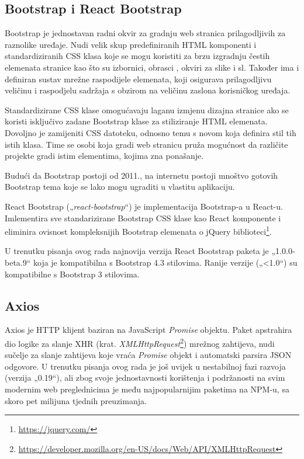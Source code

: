 \documentclass[times, utf8, diplomski, numeric]{fer}
\newcommand{\razmakp}{\vspace{18pt}}
\newcommand{\razmaks}{\vspace{10pt}}
\begin{document}
\razmaks
\subsection{Bootstrap i React Bootstrap}

Bootstrap je jednostavan radni okvir za gradnju web stranica prilagodljivih za raznolike uređaje.
Nudi velik skup predefiniranih HTML komponenti i standardiziranih CSS klasa koje se mogu koristiti za brzu izgradnju čestih elemenata stranice kao što su izbornici, obrasci , okviri za slike i sl.
Također ima i definiran sustav mrežne raspodijele elemenata, koji osigurava prilagodljivu veličinu i raspodjelu sadržaja s obzirom na veličinu zaslona korisničkog uređaja.

Standardizirane CSS klase omogućavaju laganu izmjenu dizajna stranice ako se koristi isključivo zadane Bootstrap klase za stiliziranje HTML elemenata.
Dovoljno je zamijeniti CSS datoteku, odnosno temu s novom koja definira stil tih istih klasa.
Time se osobi koja gradi web stranicu pruža mogućnost da različite projekte gradi istim elementima, kojima zna ponašanje.

Budući da Bootstrap postoji od 2011.\citep{wiki_bs}, na internetu postoji mnoštvo gotovih Bootstrap tema koje se lako mogu ugraditi u vlastitu aplikaciju.

\razmakp

React Bootstrap („\emph{react-bootstrap}“) je implementacija Bootstrap-a u React-u.
Imlementira sve standarizirane Bootstrap CSS klase kao React komponente i eliminira ovisnost kompleksnijih Bootstrap elemenata o jQuery biblioteci\footnote{\url{https://jquery.com/}}.

U trenutku pisanja ovog rada najnovija verzija React Bootstrap paketa je „1.0.0-beta.9“ koja je kompatibilna s Bootstrap 4.3 stilovima.
Ranije verzije („<1.0“) su kompatibilne s Bootstrap 3 stilovima\citep{bs_react}.


\razmaks
\subsection{Axios}

Axios je HTTP klijent baziran na JavaScript \emph{Promise} objektu.
Paket apstrahira dio logike za slanje XHR (krat. \emph{XMLHttpRequest}\footnote{\url{https://developer.mozilla.org/en-US/docs/Web/API/XMLHttpRequest}}) mrežnog zahtijeva, nudi sučelje za slanje zahtijeva koje vraća \emph{Promise} objekt i automatski parsira JSON odgovore.
U trenutku pisanja ovog rada je još uvijek u nestabilnoj fazi razvoja (verzija „0.19“), ali zbog svoje jednostavnosti korištenja i podržanosti na svim modernim web preglednicima je među najpopularnijim paketima na NPM-u, sa skoro pet milijuna tjednih preuzimanja\citep{axios}.
\end{document}
